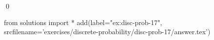 
\begin{ex} 
  \label{ex:disc-prob-17}
  
  \qed
\end{ex} 
\begin{python0}
from solutions import *
add(label="ex:disc-prob-17",
    srcfilename='exercises/discrete-probability/disc-prob-17/answer.tex') 
\end{python0}

